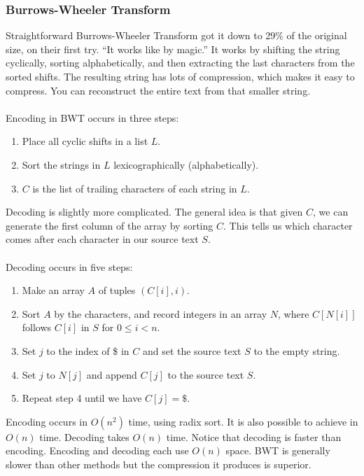 \documentclass[]{article}
\theoremstyle{definition}
\newcommand{\lecture}[1]{\marginpar{{\footnotesize $\leftarrow$ \underline{#1}}}}
\begin{document}
			\subsubsection{Burrows-Wheeler Transform}
				Straightforward Burrows-Wheeler Transform got it down to 29\% of the original size, on their first try. ``It works like by magic.'' It works by shifting the string cyclically, sorting alphabetically, and then extracting the last characters from the sorted shifts. The resulting string has lots of compression, which makes it easy to compress. You can reconstruct the entire text from that smaller string.
				\\ \\
				Encoding in BWT occurs in three steps: \lecture{April 2, 2013}
					\begin{enumerate}
						\item Place all cyclic shifts in a list $L$.
						\item Sort the strings in $L$ lexicographically (alphabetically).
						\item $C$ is the list of trailing characters of each string in $L$.
					\end{enumerate}

				Decoding is slightly more complicated. The general idea is that given $C$, we can generate the first column of the array by sorting $C$. This tells us which character comes after each character in our source text $S$.
				\\ \\
				Decoding occurs in five steps:
				\begin{enumerate}
					\item Make an array $A$ of tuples $(C[i], i)$.
					\item Sort $A$ by the characters, and record integers in an array $N$, where $C[N[i]]$ follows $C[i]$ in $S$ for $0 \le i < n$.
					\item Set $j$ to the index of \$ in $C$ and set the source text $S$ to the empty string.
					\item Set $j$ to $N[j]$ and append $C[j]$ to the source text $S$.
					\item Repeat step 4 until we have $C[j] = \$$.
				\end{enumerate}

				Encoding occurs in $O(n^2)$ time, using radix sort. It is also possible to achieve in $O(n)$ time. Decoding takes $O(n)$ time. Notice that decoding is faster than encoding. Encoding and decoding each use $O(n)$ space. BWT is generally slower than other methods but the compression it produces is superior.
\end{document}
